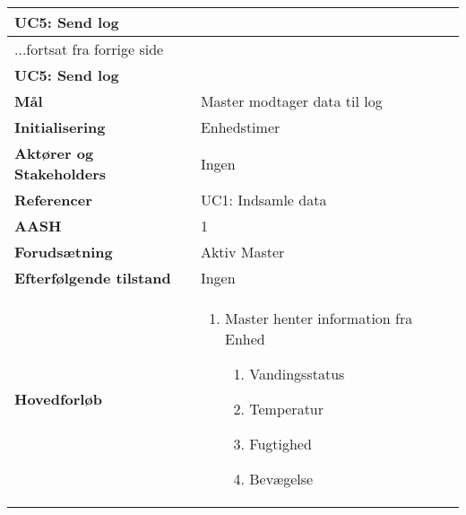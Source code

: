 \begin{center} \centering \label{UC5}
	\begin{longtable}{|p{5cm}|p{9cm}|}  %
	\hline
		\multicolumn{2}{|l|}{\textbf{UC5: Send log}} \\\hline %
		\endfirsthead
		
		\multicolumn{2}{l}{...fortsat fra forrige side} \\ \hline %
		\multicolumn{2}{|l|}{\textbf{UC5: Send log}} \\\hline %
		\endhead	
		
		\textbf{Mål}								&Master modtager data til log	\\\hline
		\textbf{Initialisering}					&Enhedstimer					\\\hline
		\textbf{Aktører og Stakeholders}			&Ingen						\\\hline
		\textbf{Referencer}						&UC1: Indsamle data			\\\hline
		\textbf{AASH}							&1							\\\hline
		\textbf{Forudsætning}					&Aktiv Master				\\\hline
		\textbf{Efterfølgende tilstand}			&Ingen						\\\hline
		\textbf{Hovedforløb}					
			&\begin{enumerate}
	
				\item Master henter information fra Enhed
				
				\begin{enumerate}
					\item Vandingsstatus
					\item Temperatur
					\item Fugtighed
					\item Bevægelse
				\end{enumerate}
	
			\end{enumerate}\\\hline
	\end{longtable} 
\end{center}


